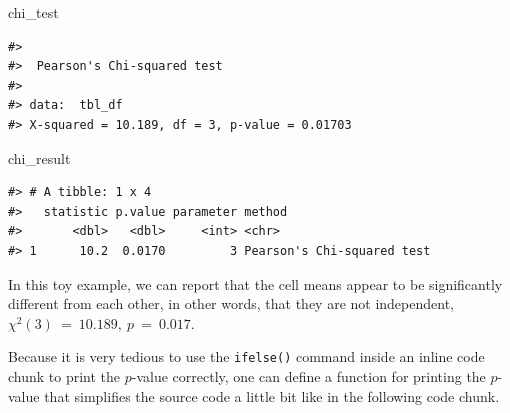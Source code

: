 \documentclass[
  11pt,
  a4paper,
  twoside]{scrbook}
\newenvironment{Shaded}{\begin{snugshade}}{\end{snugshade}}
\newcommand{\NormalTok}[1]{#1}
\begin{document}
\linespread{1}

\begin{Shaded}
\begin{Highlighting}[]
\NormalTok{chi\_test}
\end{Highlighting}
\end{Shaded}

\linespread{1}

\begin{verbatim}
#> 
#>  Pearson's Chi-squared test
#> 
#> data:  tbl_df
#> X-squared = 10.189, df = 3, p-value = 0.01703
\end{verbatim}

\linespread{1}

\begin{Shaded}
\begin{Highlighting}[]
\NormalTok{chi\_result}
\end{Highlighting}
\end{Shaded}

\linespread{1}

\begin{verbatim}
#> # A tibble: 1 x 4
#>   statistic p.value parameter method                    
#>       <dbl>   <dbl>     <int> <chr>                     
#> 1      10.2  0.0170         3 Pearson's Chi-squared test
\end{verbatim}

In this toy example, we can report that the cell means appear to be significantly different from each other, in other words, that they are not independent, \(\chi^2(3)~=~10.189,~p~=~0.017\).

Because it is very tedious to use the \texttt{ifelse()} command inside an inline code chunk to print the \(p\)-value correctly, one can define a function for printing the \(p\)-value that simplifies the source code a little bit like in the following code chunk.

\linespread{1}
\end{document}
